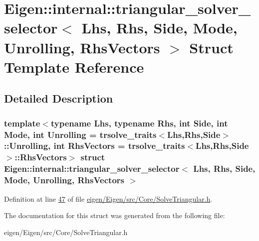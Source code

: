 \hypertarget{struct_eigen_1_1internal_1_1triangular__solver__selector}{}\section{Eigen\+:\+:internal\+:\+:triangular\+\_\+solver\+\_\+selector$<$ Lhs, Rhs, Side, Mode, Unrolling, Rhs\+Vectors $>$ Struct Template Reference}
\label{struct_eigen_1_1internal_1_1triangular__solver__selector}


\subsection{Detailed Description}
\subsubsection*{template$<$typename Lhs, typename Rhs, int Side, int Mode, int Unrolling = trsolve\+\_\+traits$<$\+Lhs,\+Rhs,\+Side$>$\+::\+Unrolling, int Rhs\+Vectors = trsolve\+\_\+traits$<$\+Lhs,\+Rhs,\+Side$>$\+::\+Rhs\+Vectors$>$\newline
struct Eigen\+::internal\+::triangular\+\_\+solver\+\_\+selector$<$ Lhs, Rhs, Side, Mode, Unrolling, Rhs\+Vectors $>$}



Definition at line \hyperlink{eigen_2_eigen_2src_2_core_2_solve_triangular_8h_source_l00047}{47} of file \hyperlink{eigen_2_eigen_2src_2_core_2_solve_triangular_8h_source}{eigen/\+Eigen/src/\+Core/\+Solve\+Triangular.\+h}.



The documentation for this struct was generated from the following file\+:\begin{DoxyCompactItemize}
\item 
eigen/\+Eigen/src/\+Core/\+Solve\+Triangular.\+h\end{DoxyCompactItemize}
